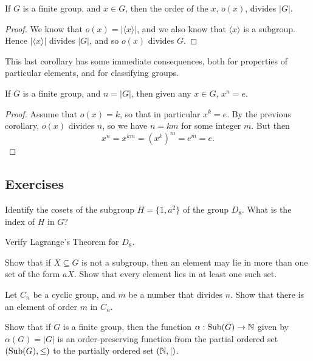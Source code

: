 \begin{corollary}
  If $G$ is a finite group, and $x \in G$, then the order of the 
  $x$, $o(x)$, divides $|G|$.
\end{corollary}
\begin{proof}
  We know that $o(x) = |\langle x \rangle|$, and we also know that 
  $\langle x \rangle$ is a subgroup.  Hence $|\langle x \rangle|$ 
  divides $|G|$, and so $o(x)$ divides $G$.
\end{proof}

This last corollary has some immediate consequences, both for 
properties of particular elements, and for classifying groups.

\begin{corollary}
  If $G$ is a finite group, and $n = |G|$, then given any $x \in G$,
  $x^{n} = e$.
\end{corollary}
\begin{proof}
  Assume that $o(x) = k$, so that in particular $x^{k} = e$.  By the
  previous corollary, $o(x)$ divides $n$, so we have $n = km$ for 
  some integer $m$.  But then
  \[
    x^{n} = x^{km} = (x^{k})^{m} = e^{m} = e.
  \]
\end{proof}

\subsection*{Exercises}

\begin{exercises}
  \item Identify the cosets of the subgroup $H = \{1, a^{2}\}$ of the group
    $D_{8}$.  What is the index of $H$ in $G$?
  
  \item Verify Lagrange's Theorem for $D_{8}$.
  
  \item Show that if $X \subseteq G$ is not a subgroup, then an element may
    lie in more than one set of the form $aX$.  Show that every element lies
    in at least one such set.
  
  \item Let $C_{n}$ be a cyclic group, and $m$ be a number that divides $n$.
    Show that there is an element of order $m$ in $C_{n}$.
  
  \item Show that if $G$ is a finite group, then the function
    $\alpha: \operatorname{Sub}(G) \to \mathbb{N}$ given by $\alpha(G) = |G|$ is an
    order-preserving function from the partial ordered set $(\operatorname{Sub}(G),
    \le)$ to the partially ordered set $(\mathbb{N}, \mid )$.
\end{exercises}

